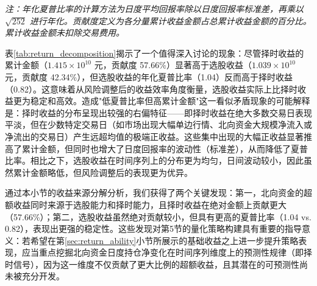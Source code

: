 \documentclass{article}
\begin{document}
\begin{table}[htbp]
    \centering
    \caption{北向资金主动交易收益的选股—择时分解统计}
    \label{tab:return_decomposition}
    \vspace{0.5em}
    \begin{minipage}{0.95\textwidth}
        \footnotesize\textit{注：年化夏普比率的计算方法为日度平均回报率除以日度回报率标准差，再乘以 $\sqrt{252}$ 进行年化。贡献度定义为各分量累计收益金额占总累计收益金额的百分比。累计收益金额未扣除交易费用。}
    \end{minipage}
\end{table}

表\ref{tab:return_decomposition}揭示了一个值得深入讨论的现象：尽管择时收益的累计金额（$1.415 \times 10^{10}$ 元，贡献度 57.66\%）显著高于选股收益（$1.039 \times 10^{10}$ 元，贡献度 42.34\%），但选股收益的年化夏普比率（1.04）反而高于择时收益（0.82）。这意味着从风险调整后的收益效率角度衡量，选股收益实际上比择时收益更为稳定和高效。造成"低夏普比率但高累计金额"这一看似矛盾现象的可能解释是：择时收益的分布呈现出较强的右偏特征——即择时收益在绝大多数交易日表现平淡，但在少数特定交易日（如市场出现大幅单边行情、北向资金大规模净流入或净流出的交易日）产生远超均值的极端正收益。这些集中出现的大幅正收益显著推高了累计金额，但同时也增大了日度回报率的波动性（标准差），从而降低了夏普比率。相比之下，选股收益在时间序列上的分布更为均匀，日间波动较小，因此虽然累计金额略低，但风险调整后的表现更为优异。

通过本小节的收益来源分解分析，我们获得了两个关键发现：第一，北向资金的超额收益同时来源于选股能力和择时能力，且择时收益在绝对金额上贡献更大（57.66\%）；第二，选股收益虽然绝对贡献较小，但具有更高的夏普比率（1.04 vs. 0.82），表现出更强的稳定性。这些发现对第5节的量化策略构建具有重要的指导意义：若希望在第\ref{sec:return_ability}小节所展示的基础收益之上进一步提升策略表现，应当重点挖掘北向资金日度持仓净变化在时间序列维度上的预测性规律（即择时信号），因为这一维度不仅贡献了更大比例的超额收益，且其潜在的可预测性尚未被充分开发。
\end{document}
